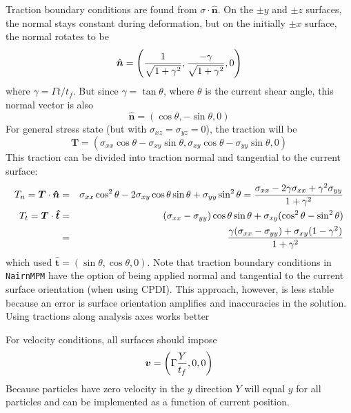\documentclass[11pt]{book}
\renewcommand{\vec}[1]{\boldsymbol{#1}}
\newcommand{\tens}[1]{\boldsymbol{\mathsf{#1}}}
\begin{document}
Traction boundary conditions are found from $\tens\sigma\cdot\hat{\vec n}$. On the $\pm y$ and $\pm z$ surfaces, the normal stays constant during deformation, but on the initially $\pm x$ surface, the normal rotates to be
\begin{equation}
     \hat{\vec n} = \left( {1\over \sqrt{1+\gamma^2}}, {-\gamma\over \sqrt{1+\gamma^2}},0\right)
\end{equation}
where $\gamma = \Gamma t/t_f$. But since $\gamma = \tan\theta$, where $\theta$ is the current shear angle, this normal vector is also
\begin{equation}
     \hat{\vec n} = \left( \cos\theta, -\sin\theta,0\right)
\end{equation}
For general stress state (but with $\sigma_{xz}=\sigma_{yz}=0$), the traction will be
\begin{equation}
     \vec T = \left(\sigma_{xx}\cos\theta - \sigma_{xy}\sin\theta, \sigma_{xy}\cos\theta - \sigma_{yy}\sin\theta,0\right)
\end{equation}
This traction can be divided into traction normal and tangential to the current surface:
\begin{eqnarray}
     T_n = \vec T\cdot\vec{\hat n} & = & \sigma_{xx}\cos^2\theta -2\sigma_{xy}\cos\theta\sin\theta + \sigma_{yy}\sin^2\theta
                     = { \sigma_{xx} - 2\gamma\sigma_{xx} + \gamma^2\sigma_{yy}\over 1+\gamma^2 } \\
     T_t = \vec T\cdot\vec{\hat t} & = & (\sigma_{xx}-\sigma_{yy})\cos\theta\sin\theta + \sigma_{xy}(\cos^2\theta -\sin^2\theta) \\
        & = &  { \gamma(\sigma_{xx}-\sigma_{yy}) + \sigma_{xy}(1 -\gamma^2) \over 1+ \gamma^2}
\end{eqnarray}
which used $\vec{\hat t} = (\sin\theta,\cos\theta,0)$. Note that traction boundary conditions in {\tt NairnMPM} have the option of being applied normal and tangential to the current surface orientation (when using CPDI). This approach, however, is less stable because an error is surface orientation amplifies and inaccuracies in the solution. Using tractions along analysis axes works better

For velocity conditions, all surfaces should impose
\begin{equation}
    \vec v = \left(\Gamma{Y\over t_f},0,0\right)
\end{equation}
Because particles have zero velocity in the $y$ direction $Y$ will equal $y$ for all particles and can be implemented as a function of current position.
\end{document}
